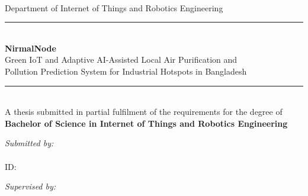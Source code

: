 \begin{titlepage}
\centering
\vspace*{0.5cm}


\vspace{1cm}
{\Large {}}\\[0.3cm]
{\large Department of Internet of Things and Robotics Engineering}\\[1.5cm]

\rule{\linewidth}{0.4mm}\\[0.4cm]
{\Huge \bfseries NirmalNode}\\[0.3cm]
{\Large Green IoT and Adaptive AI-Assisted Local Air Purification and\\
Pollution Prediction System for Industrial Hotspots in Bangladesh}\\[0.3cm]
\rule{\linewidth}{0.4mm}\\[1.5cm]

{\large A thesis submitted in partial fulfilment of the requirements for the degree of}\\[0.3cm]
{\large \bfseries Bachelor of Science in Internet of Things and Robotics Engineering}\\[1.8cm]

\begin{minipage}{0.45\textwidth}
\begin{flushleft} \large
\emph{Submitted by:}\\
\\
ID: 
\end{flushleft}
\end{minipage}
\begin{minipage}{0.45\textwidth}
\begin{flushright} \large
\emph{Supervised by:}\\
\\
\end{flushright}
\end{minipage}

\vfill

{\large {}}

\end{titlepage}
